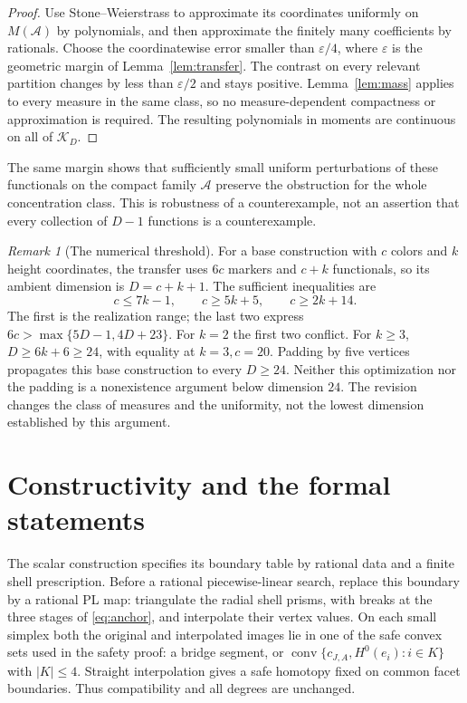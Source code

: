 \documentclass[a4paper,11pt,reqno]{amsart}
\newcommand{\conv}{\operatorname{conv}}
\theoremstyle{definition}
\theoremstyle{remark}
\newtheorem{remark}[theorem]{Remark}
\numberwithin{equation}{section}
\begin{document}
\begin{proof}
Use Stone--Weierstrass to approximate its coordinates uniformly
on $M(\mathcal A)$ by polynomials, and then approximate the finitely
many coefficients by rationals. Choose the coordinatewise error
smaller than $\varepsilon/4$, where $\varepsilon$ is the geometric
margin of Lemma~\ref{lem:transfer}. The contrast on every relevant
partition changes by less than $\varepsilon/2$ and stays positive.
Lemma~\ref{lem:mass} applies to every measure in the same class, so
no measure-dependent compactness or approximation is required.
The resulting polynomials in moments are continuous on all of
$\mathcal K_D$.
\end{proof}

The same margin shows that sufficiently small uniform perturbations
of these functionals on the compact family $\mathcal A$ preserve
the obstruction for the whole concentration class. This is robustness
of a counterexample, not an assertion that every collection of
$D-1$ functions is a counterexample.

\begin{remark}[The numerical threshold]
For a base construction with $c$ colors and $k$ height coordinates,
the transfer uses $6c$ markers and $c+k$ functionals, so its ambient
dimension is $D=c+k+1$. The sufficient inequalities are
\[
 c\le7k-1,\qquad c\ge5k+5,\qquad c\ge2k+14.
\]
The first is the realization range; the last two express
$6c>\max\{5D-1,4D+23\}$. For $k=2$ the first two conflict. For
$k\ge3$, $D\ge6k+6\ge24$, with equality at $k=3,c=20$.
Padding by five vertices propagates this base construction to every
$D\ge24$. Neither this optimization nor the padding is a
nonexistence argument below dimension $24$. The revision changes
the class of measures and the uniformity, not the lowest dimension
established by this argument.
\end{remark}

\section{Constructivity and the formal statements}\label{sec:formal}

The scalar construction specifies its boundary table by rational data
and a finite shell prescription. Before a rational piecewise-linear
search, replace this boundary by a rational PL map: triangulate the
radial shell prisms, with breaks at the three stages of
\eqref{eq:anchor}, and interpolate their vertex values. On each
small simplex both the original and interpolated images lie in one
of the safe convex sets used in the safety proof: a bridge segment,
or $\conv\{c_{J,A},H^0(e_i):i\in K\}$ with $|K|\le4$.
Straight interpolation gives a safe homotopy fixed on common facet
boundaries. Thus compatibility and all degrees are unchanged.
\end{document}
